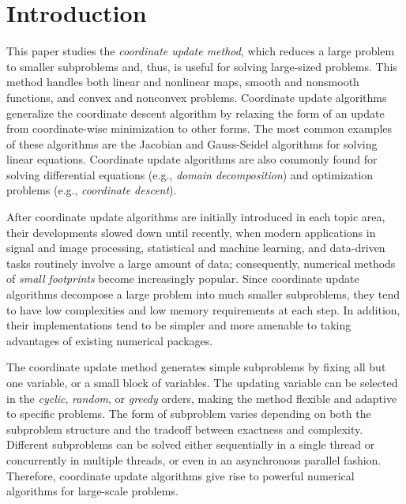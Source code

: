 \section{Introduction}
This paper studies the \emph{coordinate update method}, which reduces a large problem to smaller subproblems and, thus, is useful for solving large-sized problems. This method handles both  linear and nonlinear maps, smooth and nonsmooth functions, and convex and nonconvex problems. Coordinate update algorithms generalize the coordinate descent algorithm  by relaxing the form of an update from coordinate-wise minimization to other forms. The most common examples of these algorithms are the Jacobian and Gauss-Seidel algorithms for solving linear equations. Coordinate update algorithms are also commonly found for solving differential equations (e.g., \emph{domain decomposition}) and optimization problems (e.g., \emph{coordinate descent}).  

After coordinate update algorithms are initially introduced in each topic area, their developments  slowed down until recently, when modern applications in signal and image processing, statistical and machine learning, and data-driven tasks  routinely involve a large amount of data; consequently,  numerical methods of \emph{small footprints} become increasingly popular. Since coordinate update algorithms decompose a large problem into much smaller subproblems, they tend to have low complexities and low memory requirements at each step. In addition, their implementations tend to be simpler and more amenable to taking advantages of existing numerical packages. 

The coordinate update method generates simple subproblems by fixing all but one variable, or a small block of variables. The updating variable can be selected in  the \textit{cyclic}, \textit{random}, or \textit{greedy} orders, making the method flexible and adaptive to specific problems. The form of subproblem varies depending on both the subproblem structure and the tradeoff between exactness and complexity. Different subproblems can be solved either sequentially in a single thread or concurrently in multiple threads, or even in an asynchronous parallel fashion. Therefore, coordinate update algorithms give rise to powerful numerical algorithms for large-scale problems.


